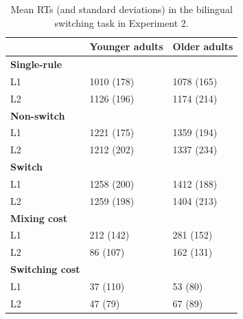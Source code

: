 \documentclass[
]{article}
\begin{document}
\begin{table}

\caption{\label{tab:Table5}Mean RTs (and standard deviations) in the bilingual switching task in Experiment 2.}
\centering
\begin{tabular}[t]{lll}
\toprule
\textbf{} & \textbf{Younger adults} & \textbf{Older adults}\\
\midrule
\textbf{Single-rule} & \textbf{} & \textbf{}\\
L1 & 1010 (178) & 1078 (165)\\
L2 & 1126 (196) & 1174 (214)\\
\textbf{Non-switch} & \textbf{} & \textbf{}\\
L1 & 1221 (175) & 1359 (194)\\
\addlinespace
L2 & 1212 (202) & 1337 (234)\\
\textbf{Switch} & \textbf{} & \textbf{}\\
L1 & 1258 (200) & 1412 (188)\\
L2 & 1259 (198) & 1404 (213)\\
\textbf{Mixing cost} & \textbf{} & \textbf{}\\
\addlinespace
L1 & 212 (142) & 281 (152)\\
L2 & 86 (107) & 162 (131)\\
\textbf{Switching cost} & \textbf{} & \textbf{}\\
L1 & 37 (110) & 53 (80)\\
L2 & 47 (79) & 67 (89)\\
\bottomrule
\end{tabular}
\end{table}
\end{document}
